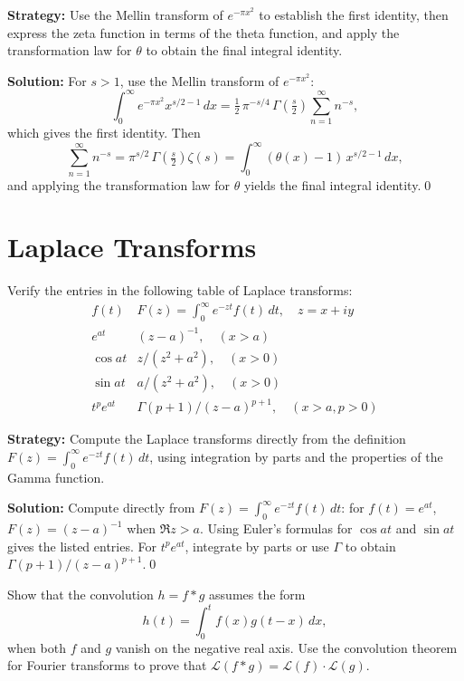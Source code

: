 \noindent\textbf{Strategy:} Use the Mellin transform of $e^{-\pi x^2}$ to establish the first identity, then express the zeta function in terms of the theta function, and apply the transformation law for $\theta$ to obtain the final integral identity.

\bigskip\noindent\textbf{Solution:}
For $s>1$, use the Mellin transform of $e^{-\pi x^2}$:
\[\int_0^{\infty} e^{-\pi x^2} x^{s/2-1}\,dx = \tfrac{1}{2}\,\pi^{-s/4}\,\Gamma\!\left(\tfrac{s}{2}\right)\sum_{n=1}^{\infty} n^{-s},\]
which gives the first identity. Then
\[\sum_{n=1}^{\infty} n^{-s}=\pi^{s/2}\,\Gamma\!\left(\tfrac{s}{2}\right)\zeta(s)=\int_0^{\infty} (\theta(x)-1)\,x^{s/2-1}\,dx,\]
and applying the transformation law for $\theta$ yields the final integral identity.\qed
\section{Laplace Transforms}



\begin{problembox}
Verify the entries in the following table of Laplace transforms:
\[
\begin{array}{ll}
f(t) & F(z) = \int_0^\infty e^{-zt} f(t) \, dt, \quad z = x + iy \\
e^{at} & (z - a)^{-1}, \quad (x > a) \\
\cos at & z/(z^2 + a^2), \quad (x > 0) \\
\sin at & a/(z^2 + a^2), \quad (x > 0) \\
t^p e^{at} & \Gamma(p + 1)/(z - a)^{p+1}, \quad (x > a, p > 0)
\end{array}
\]
\end{problembox}

\noindent\textbf{Strategy:} Compute the Laplace transforms directly from the definition $F(z)=\int_0^\infty e^{-zt}f(t)\,dt$, using integration by parts and the properties of the Gamma function.

\bigskip\noindent\textbf{Solution:}
Compute directly from $F(z)=\int_0^{\infty} e^{-zt} f(t)\,dt$: for $f(t)=e^{at}$, $F(z)=(z-a)^{-1}$ when $\Re z>a$. Using Euler's formulas for $\cos at$ and $\sin at$ gives the listed entries. For $t^p e^{at}$, integrate by parts or use $\Gamma$ to obtain $\Gamma(p+1)/(z-a)^{p+1}$.\qed


\begin{problembox}
Show that the convolution $h = f * g$ assumes the form
\[
h(t) = \int_0^t f(x) g(t - x) \, dx,
\]
when both $f$ and $g$ vanish on the negative real axis. Use the convolution theorem for Fourier transforms to prove that $\mathcal{L}(f * g) = \mathcal{L}(f) \cdot \mathcal{L}(g)$.
\end{problembox}

